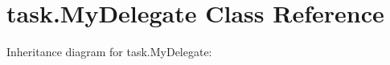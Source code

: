 \hypertarget{classtask_1_1MyDelegate}{}\section{task.\+My\+Delegate Class Reference}
\label{classtask_1_1MyDelegate}


Inheritance diagram for task.\+My\+Delegate\+:
